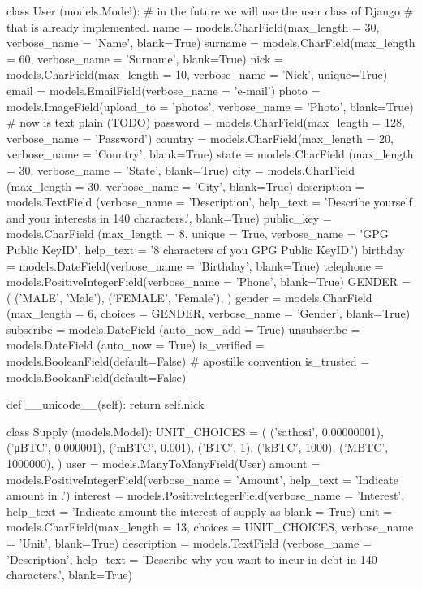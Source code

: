 \documentclass[a4paper, 12pt]{book}
\begin{document}
class User (models.Model):
  # in the future we will use the user class of Django
  # that is already implemented.
  name = models.CharField(max_length = 30, verbose_name = 'Name', blank=True)
  surname = models.CharField(max_length = 60, verbose_name = 'Surname',
     blank=True)
  nick = models.CharField(max_length = 10, verbose_name = 'Nick', unique=True)
  email = models.EmailField(verbose_name = 'e-mail')
  photo = models.ImageField(upload_to = 'photos', verbose_name = 'Photo',
     blank=True)
  # now is text plain (TODO)
  password = models.CharField(max_length = 128, verbose_name = 'Password')
  country = models.CharField(max_length = 20, verbose_name = 'Country',
     blank=True)
  state = models.CharField (max_length = 30, verbose_name = 'State',
     blank=True)
  city = models.CharField (max_length = 30, verbose_name = 'City', blank=True)
     description = models.TextField (verbose_name = 'Description',
     help_text = 'Describe yourself and your interests in 140 characters.',
     blank=True)
  public_key = models.CharField (max_length = 8, unique = True,
     verbose_name = 'GPG Public KeyID',
     help_text = '8 characters of you GPG Public KeyID.')
  birthday = models.DateField(verbose_name = 'Birthday', blank=True)
  telephone = models.PositiveIntegerField(verbose_name = 'Phone', blank=True)
  GENDER = (
          ('MALE', 'Male'),
          ('FEMALE', 'Female'),
          )
  gender = models.CharField (max_length = 6, choices = GENDER,
     verbose_name = 'Gender', blank=True)
  subscribe = models.DateField (auto_now_add = True)
  unsubscribe = models.DateField (auto_now = True)
  is_verified = models.BooleanField(default=False)
  # apostille convention
  is_trusted = models.BooleanField(default=False)
 
  def __unicode__(self):
    return self.nick
 
class Supply (models.Model):
  UNIT_CHOICES = (
          ('sathosi', 0.00000001),
          ('μBTC', 0.000001),
          ('mBTC', 0.001),
          ('BTC', 1),
          ('kBTC', 1000),
          ('MBTC', 1000000),
          )
  user = models.ManyToManyField(User)
  amount = models.PositiveIntegerField(verbose_name = 'Amount',
     help_text = 'Indicate amount in .')
  interest = models.PositiveIntegerField(verbose_name = 'Interest',
     help_text = 'Indicate amount the interest of supply as %
     blank = True)
  unit = models.CharField(max_length = 13, choices = UNIT_CHOICES,
     verbose_name = 'Unit', blank=True)
  description = models.TextField (verbose_name = 'Description',
     help_text = 'Describe why you want to incur in debt in 140 characters.',
     blank=True)
 
\end{document}
